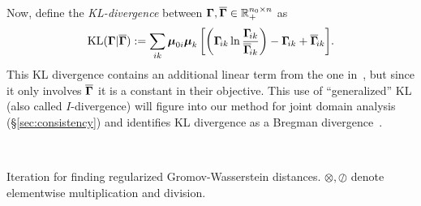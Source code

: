 Now, define the \emph{KL-divergence} between $\mathbf \Gamma,\overline{\mathbf \Gamma}\in\mathbb{R}^{n_0\times n}_+$ as
$$\mathrm{KL}(\mathbf \Gamma|\overline{\mathbf \Gamma}):=\sum_{ik} \boldsymbol{\mu}_{0i}\boldsymbol{\mu}_k \left[\left(\mathbf \Gamma\!_{ik} \ln\frac{\mathbf \Gamma\!_{ik}}{\overline{\mathbf \Gamma}\!_{ik}}\right)-\mathbf \Gamma\!_{ik}+\overline{\mathbf \Gamma}\!_{ik}\right]\!.$$
This KL divergence contains an additional linear term from the one in~\cite{solomon-2015}, but since it only involves $\overline{\mathbf \Gamma}$ it is a constant in their objective.  This use of ``generalized'' KL (also called $I$-divergence) will figure into our method for joint domain analysis (\S\ref{sec:consistency}) and identifies KL divergence as a Bregman divergence~\cite{bregman-1967}.

\begin{algorithm}[t]
\algspace\\
\vspace{-3mm}
\caption{Iteration for finding regularized Gromov-Wasserstein distances.  $\otimes,\oslash$ denote elementwise multiplication and division.\vspace{-.2in}}\label{alg:gw}
\end{algorithm}

